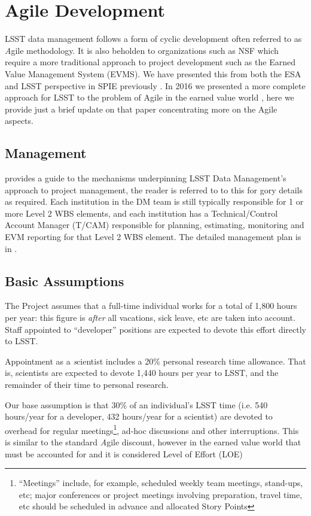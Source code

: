 \section{Agile Development}\label{sec:agile}

LSST data management follows a form of cyclic development often referred to as {\emph Agile} methodology. It is also beholden to organizations such as NSF which require a more traditional approach to project development such as the Earned Value Management System (EVMS).
We have presented this from both  the ESA and LSST perspective in SPIE previously  \cite{2014SPIE.9150E..1EG}.
In 2016  we presented a more complete approach for LSST to the problem of Agile in the earned value world \cite{2016SPIE.9911E..0NK}, here we provide just a brief update on that paper concentrating more on the Agile aspects.


\subsection{Management}
\cite{DMTN-020} provides a guide to the mechanisms underpinning LSST Data Management’s approach to project management, the reader is referred to to this for gory details as required.
Each institution in the DM team is still typically
responsible for 1 or more Level 2 WBS elements, and each institution has a Technical/Control Account Manager
(T/CAM) responsible for planning, estimating, monitoring and EVM reporting for that Level 2 WBS element.
The detailed management plan is in \cite{LDM-294}.

\subsection{Basic Assumptions}
The Project assumes that a full-time individual works for a total of
1,800 hours per year: this figure is \emph{after} all vacations, sick
leave, etc are taken into account. Staff appointed to ``developer''
positions are expected to devote this effort directly to LSST.

Appointment as a {\emph scientist} includes a 20\% personal research time
allowance. That is, scientists are expected to devote 1,440 hours per
year to LSST, and the remainder of their time to personal research.

Our base assumption is that 30\% of an individual's LSST time (i.e. 540 hours/year for a developer, 432 hours/year for a scientist) are devoted to overhead for regular meetings\footnote{``Meetings'' include, for example, scheduled weekly team meetings, stand-ups, etc; major conferences or project meetings involving preparation, travel time, etc should be scheduled in advance and allocated Story Points}, ad-hoc discussions and other interruptions.
This is similar to the standard {\emph Agile} discount, however in the earned value world that must be accounted for and it is considered Level of Effort (LOE)


